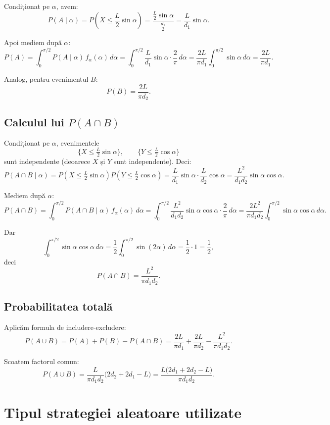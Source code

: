 \documentclass[12pt]{article}
\begin{document}
Condiționat pe $\alpha$, avem:
\[
P(A \mid \alpha) =
P\!\left(X \le \frac{L}{2}\sin\alpha\right)
=
\frac{\frac{L}{2}\sin\alpha}{\frac{d_1}{2}}
= \frac{L}{d_1}\sin\alpha.
\]

Apoi mediem după $\alpha$:
\[
P(A)
= \int_0^{\pi/2} P(A\mid\alpha)\,f_\alpha(\alpha)\,d\alpha
= \int_0^{\pi/2} \frac{L}{d_1}\sin\alpha\cdot\frac{2}{\pi}\,d\alpha
= \frac{2L}{\pi d_1} \int_0^{\pi/2}\sin\alpha\,d\alpha
= \frac{2L}{\pi d_1}.
\]

Analog, pentru evenimentul $B$:
\[
P(B) = \frac{2L}{\pi d_2}.
\]

\subsection{Calculul lui \texorpdfstring{$P(A\cap B)$}{P(A∩B)}}

Condiționat pe $\alpha$, evenimentele
\[
\{X \le \tfrac{L}{2}\sin\alpha\},
\qquad
\{Y \le \tfrac{L}{2}\cos\alpha\}
\]
sunt independente (deoarece $X$ și $Y$ sunt independente). Deci:
\[
P(A\cap B \mid \alpha)
=
P\!\left(X \le \tfrac{L}{2}\sin\alpha\right)
P\!\left(Y \le \tfrac{L}{2}\cos\alpha\right)
=
\frac{L}{d_1}\sin\alpha \cdot \frac{L}{d_2}\cos\alpha
=
\frac{L^2}{d_1 d_2}\sin\alpha\cos\alpha.
\]

Mediem după $\alpha$:
\[
P(A\cap B)
= \int_0^{\pi/2} P(A\cap B\mid\alpha)\,f_\alpha(\alpha)\,d\alpha
= \int_0^{\pi/2} \frac{L^2}{d_1 d_2}\sin\alpha\cos\alpha \cdot \frac{2}{\pi}\,d\alpha
= \frac{2L^2}{\pi d_1 d_2}\int_0^{\pi/2}\sin\alpha\cos\alpha\,d\alpha.
\]

Dar
\[
\int_0^{\pi/2}\sin\alpha\cos\alpha\,d\alpha
= \frac{1}{2}\int_0^{\pi/2}\sin(2\alpha)\,d\alpha
= \frac{1}{2}\cdot 1
= \frac{1}{2},
\]
deci
\[
P(A\cap B) = \frac{L^2}{\pi d_1 d_2}.
\]

\subsection{Probabilitatea totală}

Aplicăm formula de includere-excludere:
\[
P(A\cup B)
= P(A) + P(B) - P(A\cap B)
= \frac{2L}{\pi d_1} + \frac{2L}{\pi d_2}
   - \frac{L^2}{\pi d_1 d_2}.
\]

Scoatem factorul comun:
\[
P(A\cup B)
=
\frac{L}{\pi d_1 d_2}
\bigl(2d_2 + 2d_1 - L\bigr)
=
\frac{L\bigl(2d_1 + 2d_2 - L\bigr)}{\pi d_1 d_2}.
\]

\newpage
{}\par
\section{Tipul strategiei aleatoare utilizate}
\end{document}
